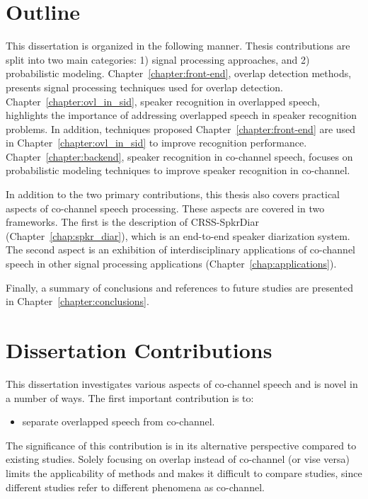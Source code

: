 \section{Outline}
\label{sec:intro_outline}
This dissertation is organized in the following manner. 
Thesis contributions are split into two main categories: 1) signal processing approaches, and 2) probabilistic modeling. 
Chapter~\ref{chapter:front-end}, overlap detection methods, presents signal processing techniques used for overlap detection. 
Chapter~\ref{chapter:ovl_in_sid}, speaker recognition in overlapped speech, highlights the importance of addressing overlapped speech in speaker recognition problems. 
In addition, techniques proposed Chapter~\ref{chapter:front-end} are used in Chapter~\ref{chapter:ovl_in_sid} to improve recognition performance. 
Chapter~\ref{chapter:backend}, speaker recognition in co-channel speech, focuses on probabilistic modeling techniques to improve speaker recognition in co-channel. 

In addition to the two primary contributions, this thesis also covers practical aspects of co-channel speech processing. 
These aspects are covered in two frameworks. 
The first is the description of CRSS-SpkrDiar (Chapter~\ref{chap:spkr_diar}), which is an end-to-end speaker diarization system. 
The second aspect is an exhibition of interdisciplinary applications of co-channel speech  in other signal processing applications (Chapter~\ref{chap:applications}). 

Finally, a summary of conclusions and references to future studies are presented in Chapter~\ref{chapter:conclusions}. 

\section{Dissertation Contributions}
\label{sec:contributions}
This dissertation investigates various aspects of co-channel speech and is novel in a number of ways. 
The first important contribution is to:
\begin{itemize}
	\item separate overlapped speech from co-channel.
\end{itemize}
The significance of this contribution is in its alternative perspective compared to existing studies. 
Solely focusing on overlap instead of co-channel (or vise versa) limits the applicability of methods and makes it difficult to compare studies, since different studies refer to different phenomena as co-channel. 

